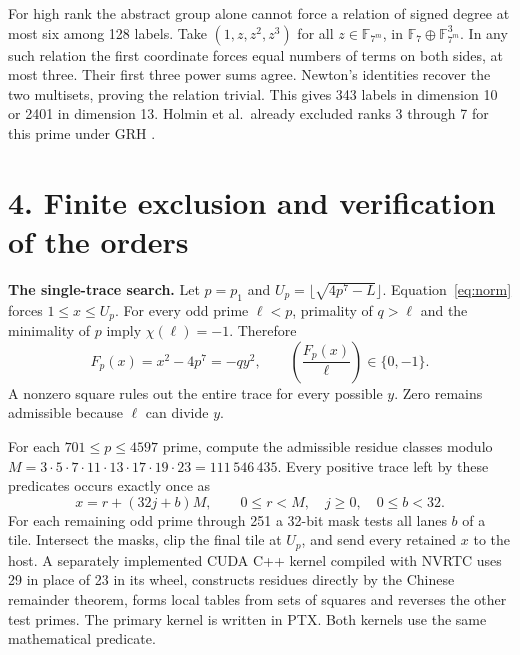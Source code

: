 \documentclass[11pt,letterpaper]{article}
\newcommand{\F}{\mathbb F}
\newcommand{\sect}[1]{\section*{#1}}
\begin{document}
For high rank the abstract group alone cannot force a relation of signed
degree at most six among 128 labels. Take \((1,z,z^2,z^3)\) for all
\(z\in\F_{7^m}\), in \(\F_7\oplus\F_{7^m}^3\). In any such relation the
first coordinate forces equal numbers of terms on both sides, at most three.
Their first three power sums agree. Newton's identities recover the two
multisets, proving the relation trivial. This gives 343 labels in
dimension 10 or 2401 in dimension 13. Holmin et al.\ already excluded
ranks 3 through 7 for this prime under GRH \cite[\S1.1.1]{HJKMP}.

\newpage
\sect{4. Finite exclusion and verification of the orders}
\textbf{The single-trace search.}
Let \(p=p_1\) and \(U_p=\lfloor\sqrt{4p^7-L}\rfloor\).
Equation~\eqref{eq:norm} forces \(1\le x\le U_p\). For every odd prime
\(\ell<p\), primality of \(q>\ell\) and the minimality of \(p\) imply
\(\chi(\ell)=-1\). Therefore
\[
 F_p(x)=x^2-4p^7=-qy^2,\qquad
 \left(\frac{F_p(x)}{\ell}\right)\in\{0,-1\}.
\]
A nonzero square rules out the entire trace for every possible \(y\).
Zero remains admissible because \(\ell\) can divide \(y\).

For each \(701\le p\le4597\) prime, compute the admissible residue classes
modulo \(M=3\cdot5\cdot7\cdot11\cdot13\cdot17\cdot19\cdot23=111\,546\,435\).
Every positive trace left by these predicates occurs exactly once as
\[
 x=r+(32j+b)M,\qquad 0\le r<M,\quad j\ge0,\quad 0\le b<32 .
\]
For each remaining odd prime through 251 a 32-bit mask tests all lanes
\(b\) of a tile. Intersect the masks, clip the final tile at \(U_p\),
and send every retained \(x\) to the host. A separately implemented
CUDA C++ kernel compiled with NVRTC uses 29 in place of 23 in its wheel,
constructs residues directly by the Chinese remainder theorem, forms local
tables from sets of squares and reverses the other test primes. The primary
kernel is written in PTX. Both kernels use the same mathematical predicate.
\end{document}
